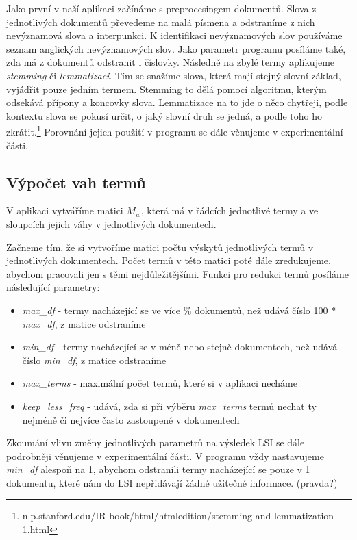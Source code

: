\documentclass[11pt]{scrartcl} %
\begin{document}
Jako první v naší aplikaci začínáme s preprocesingem dokumentů. Slova z jednotlivých dokumentů převedeme na malá písmena a odstraníme z nich nevýznamová slova a interpunkci. K identifikaci nevýznamových slov používáme seznam anglických nevýznamových slov. Jako parametr programu posíláme také, zda má z dokumentů odstranit i číslovky. Následně na zbylé termy aplikujeme \emph{stemming} či \emph{lemmatizaci}. Tím se snažíme slova, která mají stejný slovní základ, vyjádřit pouze jedním termem. Stemming to dělá pomocí algoritmu, kterým odsekává přípony a koncovky slova. Lemmatizace na to jde o něco chytřeji, podle kontextu slova se pokusí určit, o jaký slovní druh se jedná, a podle toho ho zkrátit.\footnote{nlp.stanford.edu/IR-book/html/htmledition/stemming-and-lemmatization-1.html} Porovnání jejich použití v programu se dále věnujeme v experimentální části.

\subsection{Výpočet vah termů}
V aplikaci vytváříme matici $M_w$, která má v řádcích jednotlivé termy a ve sloupcích jejich váhy v jednotlivých dokumentech.

\bigskip 

Začneme tím, že si vytvoříme matici počtu výskytů jednotlivých termů v jednotlivých dokumentech. Počet termů v této matici poté dále zredukujeme, abychom pracovali jen s těmi nejdůležitějšími. Funkci pro redukci termů posíláme následující parametry:
\begin{itemize}
	\item \emph{max\_df} - termy nacházející se ve více \% dokumentů, než udává číslo 100 * \emph{max\_df}, z matice odstraníme
	\item \emph{min\_df} - termy nacházející se v méně nebo stejně dokumentech, než udává číslo \emph{min\_df}, z matice odstraníme
	\item \emph{max\_terms} - maximální počet termů, které si v aplikaci necháme
	\item \emph{keep\_less\_freq} - udává, zda si při výběru \emph{max\_terms} termů nechat ty nejméně či nejvíce často zastoupené v dokumentech  
\end{itemize}

\bigskip 

Zkoumání vlivu změny jednotlivých parametrů na výsledek LSI se dále podrobněji věnujeme v experimentální části. V programu vždy nastavujeme \emph{min\_df} alespoň na 1, abychom odstranili termy nacházející se pouze v 1 dokumentu, které nám do LSI nepřidávají žádné užitečné informace. (pravda?)
\end{document}
